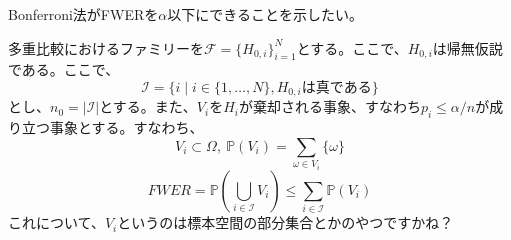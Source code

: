 \documentclass[12pt]{jarticle}
\numberwithin{equation}{section}    %
\numberwithin{figure}{section}      %
\numberwithin{table}{section}      %
\begin{document}
Bonferroni法がFWERを$\alpha$以下にできることを示したい。

多重比較におけるファミリーを$\mathcal{F} = \{H_{0, i}\}_{i = 1}^{N}$とする。ここで、$H_{0, i}$は帰無仮説である。ここで、
\begin{equation}
    \mathcal{I} = \{i \mid i \in \{1, \ldots, N\}, H_{0, i}は真である\}
\end{equation}
とし、$n_{0} = |\mathcal{I}|$とする。また、$V_{i}$を$H_{i}$が棄却される事象、すなわち$p_{i} \le \alpha / n$が成り立つ事象とする。すなわち、
\begin{equation}
    V_{i} \subset \Omega, ~ \mathbb{P}(V_{i}) = \sum_{\omega \in V_{i}} \mathbb{\{\omega\}}
\end{equation}
\begin{equation}
    FWER = \mathbb{P}\left(\bigcup_{i \in \mathcal{I}} V_{i}\right) \le \sum_{i \in \mathcal{I}} \mathbb{P}(V_{i})
\end{equation}
これについて、$V_{i}$というのは標本空間の部分集合とかのやつですかね？
\end{document}
